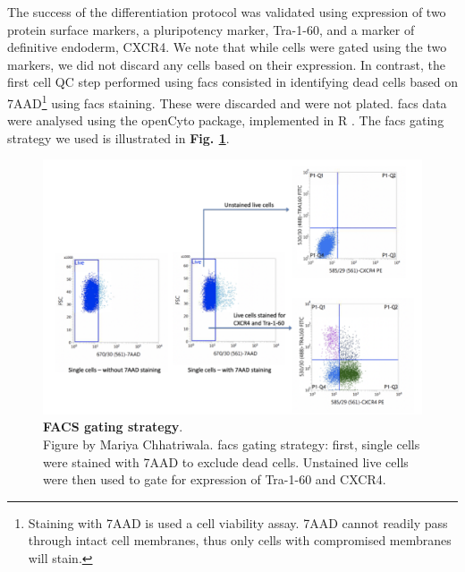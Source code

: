 The success of the differentiation protocol was validated using expression of two protein surface markers, a pluripotency marker, Tra-1-60, and a marker of definitive endoderm, CXCR4. 
We note that while cells were gated using the two markers, we did not discard any cells based on their expression. 
In contrast, the first cell QC step performed using \gls{facs} consisted in identifying dead cells based on 7AAD\footnote{Staining with 7AAD is used a cell viability assay.
7AAD cannot readily pass through intact cell membranes, thus only cells with compromised membranes will stain.} using \gls{facs} staining.
These were discarded and were not plated. 
\gls{facs} data were analysed using the openCyto package, implemented in R \cite{finak2014opencyto}.
The \gls{facs} gating strategy we used is illustrated in \textbf{Fig. \ref{fig:endodiff_facs_strategy}}.

\begin{figure}[h]
\centering
\includegraphics[width=14cm]{Chapter4/Fig/endodiff_facs_strategy.png}
\caption[FACS gating strategy]{\textbf{FACS gating strategy}.\\
Figure by Mariya Chhatriwala.
\gls{facs} gating strategy: first, single cells were stained with 7AAD to exclude dead cells. 
Unstained live cells were then used to gate for expression of Tra-1-60 and CXCR4.}
\label{fig:endodiff_facs_strategy}
\end{figure}


\newpage


